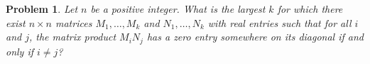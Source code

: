 \documentclass[12pt]{article}
\newtheorem{opg}{Problem}
\begin{document}
\begin{opg}
Let $n$ be a positive integer. What is the largest $k$ for which there exist $n \times n$ matrices $M_1, \dots, M_k$ and $N_1, \dots, N_k$ with real entries such that for all $i$ and $j$, the matrix product $M_i N_j$ has a zero entry somewhere on its diagonal if and only if $i \neq j$?

\end{opg}
\end{document}

